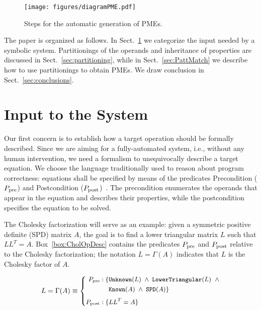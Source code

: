 \documentclass{llncs}
\newcommand{\prop}[2]{{\tt{#1(}}#2{\tt{)}}}
\begin{document}
\begin{figure}[t]
  \centering
  \texttt{[image: figures/diagramPME.pdf]}
  \caption{Steps for the automatic generation of PMEs.} \label{fig:stepsPME}
\end{figure}

The paper is organized as follows. In Sect.~\ref{sec:input} we categorize
the input needed by a symbolic system. Partitionings of the operands and 
inheritance of properties are discussed in Sect.~\ref{sec:partitioning}, 
while in Sect.~\ref{sec:PattMatch} we describe how to use partitionings 
to obtain PMEs. We draw conclusion in Sect.~\ref{sec:conclusions}.

\section{Input to the System} \label{sec:input}

Our first concern is to establish how a target operation should be
formally described.  
Since we are
aiming for a fully-automated system, i.e., without any human
intervention, we need a formalism to unequivocally describe a target
equation.
We choose the language traditionally used to reason about program correctness: 
equations shall be specified by means of the predicates Precondition ($P_{\rm pre}$) and
Postcondition ($P_{\rm post}$)~\cite{GrSc:92}. The precondition enumerates
the operands that appear in the equation and describes their properties, while
the postcondition specifies the equation to be solved.

The Cholesky factorization will serve as an example:
given a symmetric positive definite (SPD) matrix $A$, the goal is to find a
lower triangular matrix $L$ such that $L L^T = A$.
Box~\ref{box:CholOpDesc} contains the predicates $P_{\rm pre}$ and $P_{\rm post}$
relative to the Cholesky factorization; 
the notation $L = \Gamma(A)$ indicates that $L$ is the Cholesky factor of $A$.
\begin{mybox}
$$
\small
L = \Gamma(A) \equiv
\left\{
\begin{split}
P_{\rm pre}: \{ & \prop{Unknown}{L} \; \wedge \; \prop{LowerTriangular}{L} \;\; \wedge \\
            & \prop{Known}{A} \; \wedge \; \prop{SPD}{A} \} \\
\\[-4mm]
P_{\rm post}: \{ &  L L^T = A \}
\end{split}
\right.
$$
\caption{Formal description for the Cholesky factorization.}
\label{box:CholOpDesc}
\end{mybox}
\end{document}
